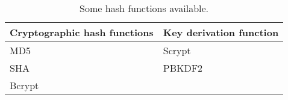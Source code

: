 	\begin{table}[h!]
	\begin{center}
		\begin{tabularx}{\textwidth}{|l|l|}
			\hline
			\textbf{Cryptographic hash functions} & \textbf{Key derivation function}\\\hline
			MD5 & Scrypt \\
			SHA & PBKDF2 \\
			Bcrypt & \\
		\end{tabularx}
		\caption{Some hash functions available.}
		\label{tab:table11}
	\end{center}
\end{table}